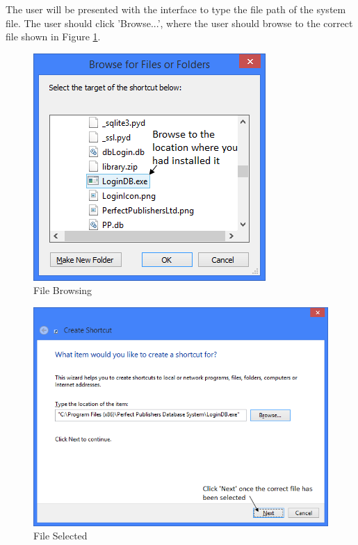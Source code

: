 The user will be presented with the interface to type the file path of the system file. The user should click 'Browse...', where the user should browse to the correct file shown in Figure \ref{fig:BrowseFile}.

\begin{figure}[H]
    \includegraphics[width=\textwidth]{./Manual/Installation/BrowseFile.png}
    \caption{File Browsing} \label{fig:BrowseFile}
\end{figure}

\begin{figure}[H]
    \includegraphics[width=\textwidth]{./Manual/Installation/FileSelected.png}
    \caption{File Selected} \label{fig:FileSelected}
\end{figure}


